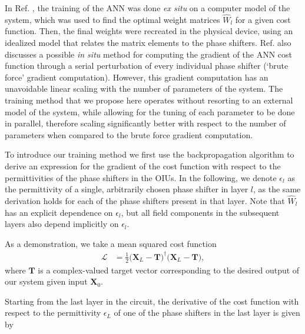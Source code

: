 In Ref. \cite{shen2017deep}, the training of the ANN was done \textit{ex situ} on a computer model of the system, which was used to find the optimal weight matrices $\hat{W}_l$ for a given cost function. Then, the final weights were recreated in the physical device, using an idealized model that relates the matrix elements to the phase shifters. Ref. \cite{shen2017deep} also discusses a possible \textit{in situ} method for computing the gradient of the ANN cost function through a serial perturbation of every individual phase shifter (`brute force' gradient computation). However, this gradient computation has an unavoidable linear scaling with the number of parameters of the system.  The training method that we propose here operates without resorting to an external model of the system, while allowing for the tuning of each parameter to be done in parallel, therefore scaling significantly better with respect to the number of parameters when compared to the brute force gradient computation.

To introduce our training method we first use the backpropagation algorithm to derive an expression for the gradient of the cost function with respect to the permittivities of the phase shifters in the OIUs. In the following, we denote $\epsilon_l$ as the permittivity of a single, arbitrarily chosen phase shifter in layer $l$, as the same derivation holds for each of the phase shifters present in that layer.  Note that $\hat{W}_l$ has an explicit dependence on $\epsilon_l$, but all field components in the subsequent layers also depend implicitly on $\epsilon_l$.

As a demonstration, we take a mean squared cost function
\begin{align}
\mathcal{L} &= \frac{1}{2}\big(\mathbf{X}_L -\mathbf{T} \big)^\dagger \big( \mathbf{X}_L -\mathbf{T} \big),
\label{eq:NN_forward}
\end{align}
where $\mathbf{T}$ is a complex-valued target vector corresponding to the desired output of our system given input $\mathbf{X}_0$.

Starting from the last layer in the circuit, the derivative of the cost function with respect to the permittivity $\epsilon_L$ of one of the phase shifters in the last layer is given by


